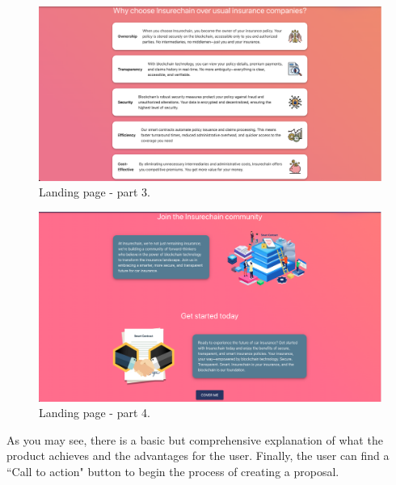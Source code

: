 {\begin{figure}[H]
\centering
\includegraphics[width=14cm]{img/results/landing-3.png}
\caption[Landing page - part 3]{\footnotesize{Landing page - part 3.}}
\label{fig:landing-3}
\end{figure}

\begin{figure}[H]
\centering
\includegraphics[width=14cm]{img/results/landing-4.png}
\caption[Landing page - part 4]{\footnotesize{Landing page - part 4.}}
\label{fig:landing-4}
\end{figure}

As you may see, there is a basic but comprehensive explanation of what the product achieves and the advantages for the user. Finally, the user can find a ``Call to action" button to begin the process of creating a proposal.
}

